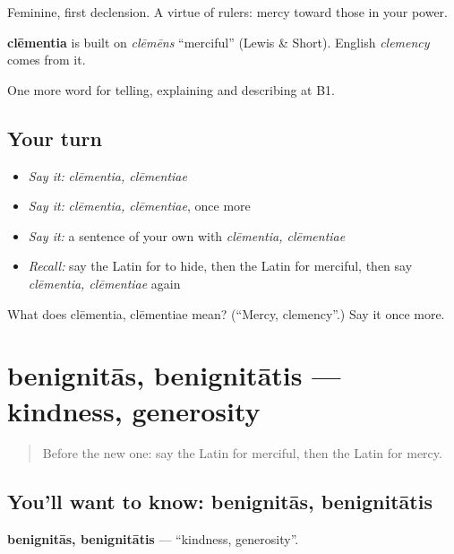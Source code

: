 Feminine, first declension. A virtue of rulers: mercy toward those in your power.

\begin{cousinweb}
\textbf{clēmentia} is built on \emph{clēmēns} \textquotedblleft{}merciful\textquotedblright{} (Lewis \& Short). English \emph{clemency} comes from it.
\end{cousinweb}

\begin{grammarlens}[title={What you've built}]
One more word for telling, explaining and describing at B1.
\end{grammarlens}

\subsection*{Your turn}
\begin{itemize}
\raggedright
  \item \emph{Say it:} \emph{clēmentia, clēmentiae}
  \item \emph{Say it:} \emph{clēmentia, clēmentiae}, once more
  \item \emph{Say it:} a sentence of your own with \emph{clēmentia, clēmentiae}
  \item \emph{Recall:} say the Latin for to hide, then the Latin for merciful, then say \emph{clēmentia, clēmentiae} again
\end{itemize}

\begin{tcolorbox}[breakable,colback=teal!4,colframe=teal!35!black,title={Before you move on}]
What does clēmentia, clēmentiae mean? (\textquotedblleft{}Mercy, clemency\textquotedblright{}.) Say it once more.
\end{tcolorbox}
\section[benignitās, benignitātis]{benignitās, benignitātis — kindness, generosity}

\label{lesson:LA-C505-benignitas}



\begin{quote}
Before the new one: say the Latin for merciful, then the Latin for mercy.
\end{quote}

\subsection*{You'll want to know: benignitās, benignitātis}
\textbf{benignitās, benignitātis} — \textquotedblleft{}kindness, generosity\textquotedblright{}.

